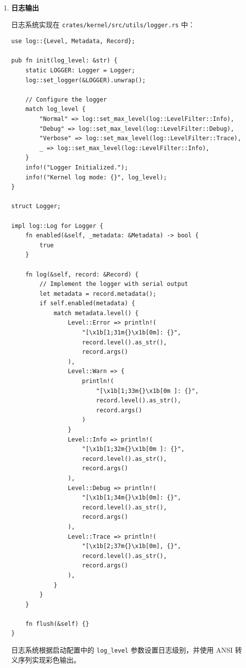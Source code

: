 \documentclass{SYSUReport}
\begin{document}
\begin{enumerate}[label={\chinese*、},labelsep=0pt, start=5]
    \item \textbf{日志输出}

    日志系统实现在 \texttt{crates/kernel/src/utils/logger.rs} 中：

    \begin{verbatim}
use log::{Level, Metadata, Record};

pub fn init(log_level: &str) {
    static LOGGER: Logger = Logger;
    log::set_logger(&LOGGER).unwrap();

    // Configure the logger
    match log_level {
        "Normal" => log::set_max_level(log::LevelFilter::Info),
        "Debug" => log::set_max_level(log::LevelFilter::Debug),
        "Verbose" => log::set_max_level(log::LevelFilter::Trace),
        _ => log::set_max_level(log::LevelFilter::Info),
    }
    info!("Logger Initialized.");
    info!("Kernel log mode: {}", log_level);
}

struct Logger;

impl log::Log for Logger {
    fn enabled(&self, _metadata: &Metadata) -> bool {
        true
    }

    fn log(&self, record: &Record) {
        // Implement the logger with serial output
        let metadata = record.metadata();
        if self.enabled(metadata) {
            match metadata.level() {
                Level::Error => println!(
                    "[\x1b[1;31m{}\x1b[0m]: {}",
                    record.level().as_str(),
                    record.args()
                ),
                Level::Warn => {
                    println!(
                        "[\x1b[1;33m{}\x1b[0m ]: {}",
                        record.level().as_str(),
                        record.args()
                    )
                }
                Level::Info => println!(
                    "[\x1b[1;32m{}\x1b[0m ]: {}",
                    record.level().as_str(),
                    record.args()
                ),
                Level::Debug => println!(
                    "[\x1b[1;34m{}\x1b[0m]: {}",
                    record.level().as_str(),
                    record.args()
                ),
                Level::Trace => println!(
                    "[\x1b[2;37m{}\x1b[0m], {}",
                    record.level().as_str(),
                    record.args()
                ),
            }
        }
    }

    fn flush(&self) {}
}
    \end{verbatim}

    日志系统根据启动配置中的 \texttt{log\_level} 参数设置日志级别，并使用 ANSI 转义序列实现彩色输出。


\end{enumerate}
\end{document}
